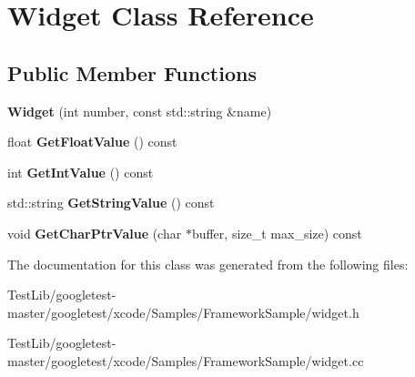 \hypertarget{classWidget}{}\section{Widget Class Reference}
\label{classWidget}
\subsection*{Public Member Functions}
\begin{DoxyCompactItemize}
\item 
\mbox{\label{classWidget_ab573b75a8a69d29c298af2485fb9cda9}} 
{\bfseries Widget} (int number, const std\+::string \&name)
\item 
\mbox{\label{classWidget_abf639d975e02cabda8132873aca1a333}} 
float {\bfseries Get\+Float\+Value} () const
\item 
\mbox{\label{classWidget_a15e7d0423020a7a98063a749fb97bdd3}} 
int {\bfseries Get\+Int\+Value} () const
\item 
\mbox{\label{classWidget_a7a6e3a7fca3a9373f631c94dc1494d22}} 
std\+::string {\bfseries Get\+String\+Value} () const
\item 
\mbox{\label{classWidget_a50791a556979f22f5593383143c7f815}} 
void {\bfseries Get\+Char\+Ptr\+Value} (char $\ast$buffer, size\+\_\+t max\+\_\+size) const
\end{DoxyCompactItemize}


The documentation for this class was generated from the following files\+:\begin{DoxyCompactItemize}
\item 
Test\+Lib/googletest-\/master/googletest/xcode/\+Samples/\+Framework\+Sample/widget.\+h\item 
Test\+Lib/googletest-\/master/googletest/xcode/\+Samples/\+Framework\+Sample/widget.\+cc\end{DoxyCompactItemize}
